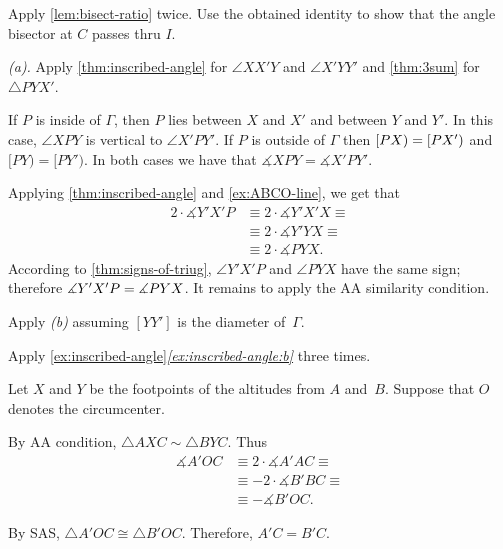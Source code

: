 \begin{multicols}{2}
Apply \ref{lem:bisect-ratio} twice.
Use the obtained identity to show that the angle bisector at $C$ passes thru $I$.

\setcounter{eqtn}{0}

 \textit{(a).}
Apply \ref{thm:inscribed-angle} for $\angle XX'Y$ and $\angle X'YY'$
and \ref{thm:3sum} for $\triangle PYX'$.

 If $P$ is inside of $\Gamma$, then $P$ lies between $X$ and $X'$ and between $Y$ and $Y'$.
In this case, $\angle XPY$ is vertical to $\angle X'PY'$.
If $P$ is outside of $\Gamma$ then $[PX)\z=[PX')$ and $[PY)=[PY')$.
In both cases we have that $\measuredangle XPY=\measuredangle X'PY'$.

Applying \ref{thm:inscribed-angle} and \ref{ex:ABCO-line}, we get that
\begin{align*}
2\cdot \measuredangle Y'X'P
&\equiv
2\cdot \measuredangle Y'X'X\equiv 
\\
&\equiv
2\cdot\measuredangle Y'YX\equiv
\\
&\equiv
2\cdot\measuredangle PYX.
\end{align*}
According to \ref{thm:signs-of-triug}, $\angle Y'X'P$ and $\angle PYX$ have the same sign;
therefore
$\measuredangle Y'X'P\z= \measuredangle PYX$.
It remains to apply the AA similarity condition.

 Apply \textit{(b)} assuming $[YY']$ is the diameter of~$\Gamma$. 

 Apply \ref{ex:inscribed-angle}\textit{\ref{ex:inscribed-angle:b}}
three times.

Let $X$ and $Y$ be the footpoints of the altitudes from $A$ and~$B$.
Suppose that $O$ denotes the circumcenter.
 
By AA condition, $\triangle A X C\sim \triangle B Y C$.
Thus 
\begin{align*}
\measuredangle A'OC
&\equiv 
2\cdot \measuredangle A' A C
\equiv
\\
&\equiv-2\cdot\measuredangle B' B C
\equiv
\\
&\equiv-\measuredangle B'OC.
\end{align*}

By SAS, $\triangle A'OC\cong\triangle B'OC$.
Therefore, $A'C=B'C$.


\end{multicols}
